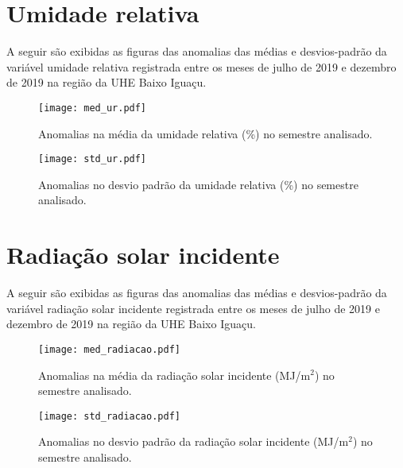 \documentclass[a4paper,12pt]{article}
\begin{document}
        
        \newpage
        
        \section{Umidade relativa }
        \hspace{0.5cm} A seguir são exibidas as figuras das anomalias das médias e desvios-padrão da variável umidade relativa 
        registrada entre os meses de julho de 2019 e dezembro de 2019 na região da UHE Baixo Iguaçu.
        
        \begin{figure}[!htb]
        \centering
        \texttt{[image: med\_ur.pdf]}
        \caption{Anomalias na média da umidade relativa (\%) no semestre analisado.}
        \label{fig:figmed_ur}
        \end{figure}
        
        \begin{figure}[!htb]
        \centering
        \texttt{[image: std\_ur.pdf]}
        \caption{Anomalias no desvio padrão da umidade relativa (\%) no semestre analisado.}
        \label{fig:figstd_ur}
        \end{figure}  
        
        
        \newpage
        
        \section{Radiação solar incidente }
        \hspace{0.5cm} A seguir são exibidas as figuras das anomalias das médias e desvios-padrão da variável radiação solar incidente 
        registrada entre os meses de julho de 2019 e dezembro de 2019 na região da UHE Baixo Iguaçu.
        
        \begin{figure}[!htb]
        \centering
        \texttt{[image: med\_radiacao.pdf]}
        \caption{Anomalias na média da radiação solar incidente (MJ/m$^2$) no semestre analisado.}
        \label{fig:figmed_radiacao}
        \end{figure}
        
        \begin{figure}[!htb]
        \centering
        \texttt{[image: std\_radiacao.pdf]}
        \caption{Anomalias no desvio padrão da radiação solar incidente (MJ/m$^2$) no semestre analisado.}
        \label{fig:figstd_radiacao}
        \end{figure}  
        
\end{document}
